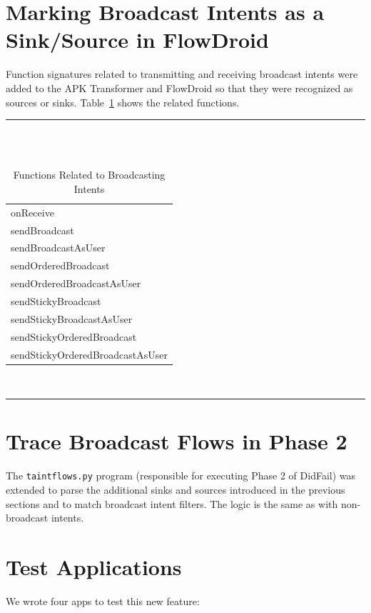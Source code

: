 \section{Marking Broadcast Intents as a Sink/Source in FlowDroid}
Function signatures related to transmitting and receiving broadcast intents were added to the APK Transformer and FlowDroid so that they were recognized as sources or sinks. Table~\ref{fnc_bcast} shows the related functions.
\begin{table}[!h]
\renewcommand{\arraystretch}{1.3}
\caption{Functions Related to Broadcasting Intents}
\label{fnc_bcast}
\centering
\rule{0.55\textwidth}{0.75pt}
\\
\tt
\begin{tabular}{l}
onReceive \\
sendBroadcast \\
sendBroadcastAsUser \\
sendOrderedBroadcast \\
sendOrderedBroadcastAsUser \\
sendStickyBroadcast \\
sendStickyBroadcastAsUser \\
sendStickyOrderedBroadcast \\
sendStickyOrderedBroadcastAsUser \\
\end{tabular}
\\
\rule{0.55\textwidth}{0.75pt}
\end{table}

\section{Trace Broadcast Flows in Phase 2}
The \texttt{taintflows.py} program (responsible for executing Phase 2 of DidFail) was extended to parse the additional sinks and sources introduced in the previous sections and to match broadcast intent filters. The logic is the same as with non-broadcast intents.

\section{Test Applications}
We wrote four apps to test this new feature:

